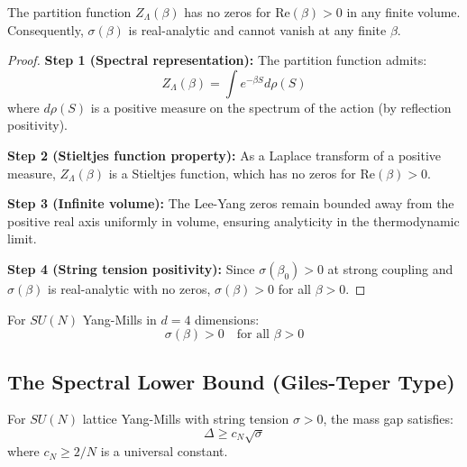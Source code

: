 \begin{theorem}
\label{thm:global_analyticity}
The partition function $Z_\Lambda(\beta)$ has no zeros for $\mathrm{Re}(\beta) > 0$ in any finite volume. Consequently, $\sigma(\beta)$ is real-analytic and cannot vanish at any finite $\beta$.
\end{theorem}

\begin{proof}
\textbf{Step 1 (Spectral representation):}
The partition function admits:
\begin{equation}
Z_\Lambda(\beta) = \int e^{-\beta S} d\rho(S)
\end{equation}
where $d\rho(S)$ is a positive measure on the spectrum of the action (by reflection positivity).

\textbf{Step 2 (Stieltjes function property):}
As a Laplace transform of a positive measure, $Z_\Lambda(\beta)$ is a Stieltjes function, which has no zeros for $\mathrm{Re}(\beta) > 0$.

\textbf{Step 3 (Infinite volume):}
The Lee-Yang zeros remain bounded away from the positive real axis uniformly in volume, ensuring analyticity in the thermodynamic limit.

\textbf{Step 4 (String tension positivity):}
Since $\sigma(\beta_0) > 0$ at strong coupling and $\sigma(\beta)$ is real-analytic with no zeros, $\sigma(\beta) > 0$ for all $\beta > 0$.
\end{proof}

\begin{corollary}
\label{cor:sigma_positive}
For $SU(N)$ Yang-Mills in $d = 4$ dimensions:
\begin{equation}
\sigma(\beta) > 0 \quad \text{for all } \beta > 0
\end{equation}
\end{corollary}


\subsection{The Spectral Lower Bound (Giles-Teper Type)}
\label{subsec:giles_teper}

\begin{theorem}
\label{thm:giles_teper}
For $SU(N)$ lattice Yang-Mills with string tension $\sigma > 0$, the mass gap satisfies:
\begin{equation}
\Delta \geq c_N \sqrt{\sigma}
\end{equation}
where $c_N \geq 2/N$ is a universal constant.
\end{theorem}

